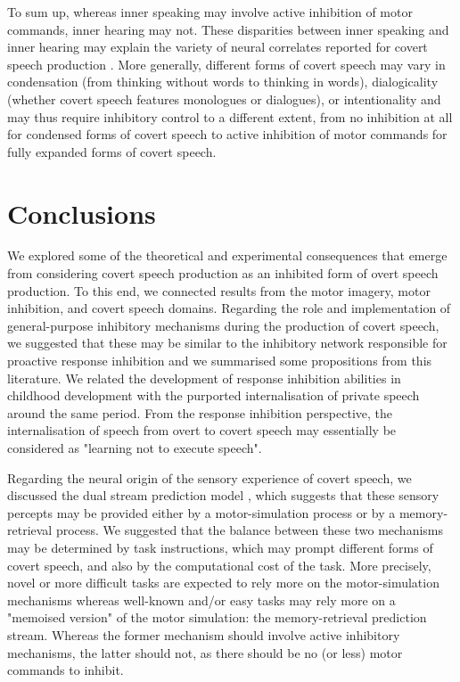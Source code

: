 \documentclass[utf8]{template/frontiersSCNS} %
\begin{document}
To sum up, whereas inner speaking may involve active inhibition of motor commands, inner hearing may not. These disparities between inner speaking and inner hearing may explain the variety of neural correlates reported for covert speech production \citep[as reviewed for instance in][]{geva_inner_2018}. More generally, different forms of covert speech may vary in condensation (from thinking without words to thinking in words), dialogicality (whether covert speech features monologues or dialogues), or intentionality \citep[for more details, see][]{grandchamp_condialint_2019} and may thus require inhibitory control to a different extent, from no inhibition at all for condensed forms of covert speech to active inhibition of motor commands for fully expanded forms of covert speech.

\section{Conclusions}

We explored some of the theoretical and experimental consequences that emerge from considering covert speech production as an inhibited form of overt speech production. To this end, we connected results from the motor imagery, motor inhibition, and covert speech domains. Regarding the role and implementation of general-purpose inhibitory mechanisms during the production of covert speech, we suggested that these may be similar to the inhibitory network responsible for proactive response inhibition and we summarised some propositions from this literature. We related the development of response inhibition abilities in childhood development with the purported internalisation of private speech around the same period. From the response inhibition perspective, the internalisation of speech from overt to covert speech may essentially be considered as "learning not to execute speech".

Regarding the neural origin of the sensory experience of covert speech, we discussed the dual stream prediction model \citep{tian_mental_2012, tian_effect_2013, tian_mental_2016}, which suggests that these sensory percepts may be provided either by a motor-simulation process or by a memory-retrieval process. We suggested that the balance between these two mechanisms may be determined by task instructions, which may prompt different forms of covert speech, and also by the computational cost of the task. More precisely, novel or more difficult tasks are expected to rely more on the motor-simulation mechanisms whereas well-known and/or easy tasks may rely more on a "memoised version" of the motor simulation: the memory-retrieval prediction stream. Whereas the former mechanism should involve active inhibitory mechanisms, the latter should not, as there should be no (or less) motor commands to inhibit.
\end{document}
